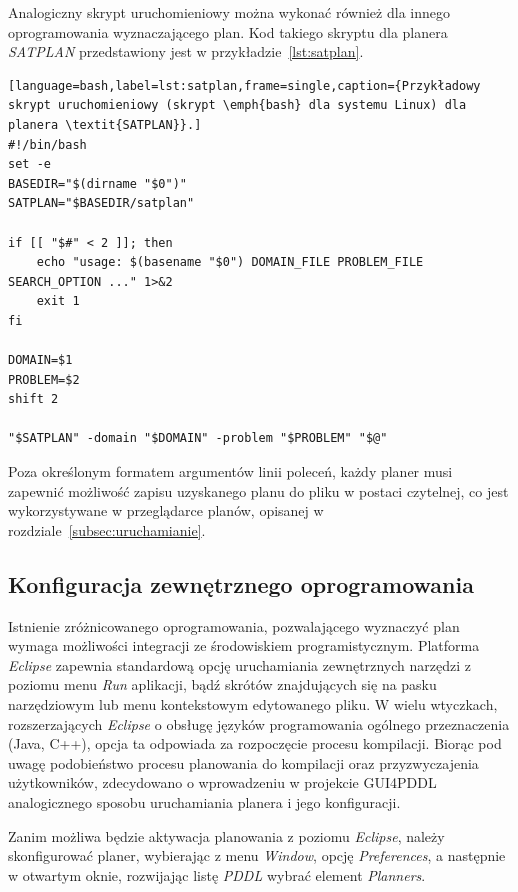 Analogiczny skrypt uruchomieniowy można wykonać również dla innego oprogramowania wyznaczającego plan. Kod takiego skryptu dla planera \emph{SATPLAN} przedstawiony jest w przykładzie~\ref{lst:satplan}.
  
\begin{Code}
\begin{lstlisting}[language=bash,label=lst:satplan,frame=single,caption={Przykładowy skrypt uruchomieniowy (skrypt \emph{bash} dla systemu Linux) dla planera \textit{SATPLAN}}.]
#!/bin/bash
set -e
BASEDIR="$(dirname "$0")"
SATPLAN="$BASEDIR/satplan"

if [[ "$#" < 2 ]]; then
    echo "usage: $(basename "$0") DOMAIN_FILE PROBLEM_FILE SEARCH_OPTION ..." 1>&2
    exit 1
fi

DOMAIN=$1
PROBLEM=$2
shift 2

"$SATPLAN" -domain "$DOMAIN" -problem "$PROBLEM" "$@"
\end{lstlisting}
\end{Code}

Poza określonym formatem argumentów linii poleceń, każdy planer musi zapewnić możliwość zapisu uzyskanego planu do pliku w postaci czytelnej, co jest wykorzystywane w przeglądarce planów, opisanej w rozdziale~\ref{subsec:uruchamianie}.

\subsection{Konfiguracja zewnętrznego oprogramowania}
\label{subsec:konfiguracja}
Istnienie zróżnicowanego oprogramowania, pozwalającego wyznaczyć plan wymaga możliwości integracji ze środowiskiem programistycznym. Platforma \emph{Eclipse} zapewnia standardową opcję uruchamiania zewnętrznych narzędzi z poziomu menu \emph{Run} aplikacji, bądź skrótów znajdujących się na pasku narzędziowym lub menu kontekstowym edytowanego pliku. W wielu wtyczkach, rozszerzających \emph{Eclipse} o obsługę języków programowania ogólnego przeznaczenia (Java, C++), opcja ta odpowiada za rozpoczęcie procesu kompilacji. Biorąc pod uwagę podobieństwo procesu planowania do kompilacji oraz przyzwyczajenia użytkowników, zdecydowano o wprowadzeniu w projekcie GUI4PDDL analogicznego sposobu uruchamiania planera i jego konfiguracji.

Zanim możliwa będzie aktywacja planowania z poziomu \emph{Eclipse}, należy skonfigurować planer, wybierając z menu \emph{Window}, opcję \emph{Preferences}, a następnie w otwartym oknie, rozwijając listę \emph{PDDL} wybrać element \emph{Planners}.

